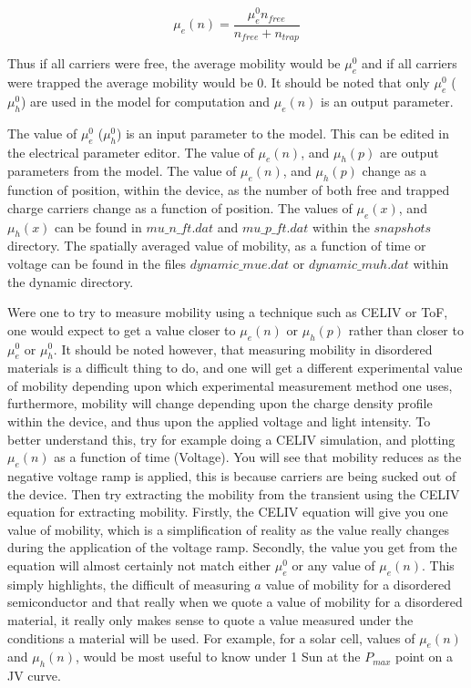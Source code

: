 \documentclass[11pt]{article}
\begin{document}
\begin{equation}
\mu_e(n)=\frac{\mu_e^0 n_{free}}{n_{free}+n_{trap}}
\end{equation}

Thus if all carriers were free, the average mobility would be $\mu_e^0$ and if all carriers were trapped the average mobility would be 0.  It should be noted that only $\mu_e^0$ ($\mu_h^0$) are used in the model for computation and $\mu_e(n)$ is an output parameter.

The value of $\mu_e^0$ ($\mu_h^0$) is an input parameter to the model.  This can be edited in the electrical parameter editor.  The value of $\mu_e(n)$, and $\mu_h(p)$ are output parameters from the model.  The value of $\mu_e(n)$, and $\mu_h(p)$ change as a function of position, within the device, as the number of both free and trapped charge carriers change as a function of position.  The values of  $\mu_e(x)$, and $\mu_h(x)$ can be found in $mu\_n\_ft.dat$ and $mu\_p\_ft.dat$ within the $snapshots$ directory.  The spatially averaged value of mobility, as a function of time or voltage can be found in the files $dynamic\_mue.dat$ or $dynamic\_muh.dat$ within the dynamic directory.

Were one to try to measure mobility using a technique such as CELIV or ToF, one would expect to get a value closer to $\mu_e(n)$ or $\mu_h(p)$ rather than closer to $\mu_e^0$ or $\mu_h^0$.  It should be noted however, that measuring mobility in disordered materials is a difficult thing to do, and one will get a different experimental value of mobility depending upon which experimental measurement method one uses, furthermore, mobility will change depending upon the charge density profile within the device, and thus upon the applied voltage and light intensity.  To better understand this, try for example doing a CELIV simulation, and plotting $\mu_e(n)$ as a function of time (Voltage).  You will see that mobility reduces as the negative voltage ramp is applied, this is because carriers are being sucked out of the device.  Then try extracting the mobility from the transient using the CELIV equation for extracting mobility.  Firstly, the CELIV equation will give you one value of mobility, which is a simplification of reality as the value really changes during the application of the voltage ramp.  Secondly, the value you get from the equation will almost certainly not match either $\mu_e^0$ or any value of $\mu_e(n)$.  This simply highlights, the difficult of measuring $a$ value of mobility for a disordered semiconductor and that really when we quote a value of mobility for a disordered material, it really only makes sense to quote a value measured under the conditions a material will be used.  For example, for a solar cell, values of $\mu_e(n)$ and $\mu_h(n)$, would be most useful to know under 1 Sun at the $P_{max}$ point on a JV curve.
\end{document}
